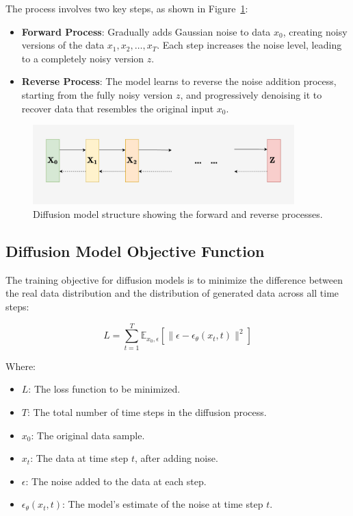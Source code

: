 The process involves two key steps, as shown in Figure~\ref{fig:Diffusion_structure}:
\begin{itemize}
  \item \textbf{Forward Process}: Gradually adds Gaussian noise to data \(x_0\), creating noisy versions of the data \(x_1, x_2, \dots, x_T\). Each step increases the noise level, leading to a completely noisy version \(z\).
  \item \textbf{Reverse Process}: The model learns to reverse the noise addition process, starting from the fully noisy version \(z\), and progressively denoising it to recover data that resembles the original input \(x_0\).
\end{itemize}

\begin{figure}[H]
    \centering
    \includegraphics[width=0.9\textwidth]{./Images/Diffusion_structure.jpg}
    \caption{Diffusion model structure showing the forward and reverse processes.}
    \label{fig:Diffusion_structure}
\end{figure}

\subsection{Diffusion Model Objective Function}

The training objective for diffusion models is to minimize the difference between the real data distribution and the distribution of generated data across all time steps:

\begin{equation}
L = \sum_{t=1}^{T} \mathbb{E}_{x_0, \epsilon} \left[ \|\epsilon - \epsilon_\theta(x_t, t)\|^2 \right]
\end{equation}

Where:
\begin{itemize}
    \item \(L\): The loss function to be minimized.
    \item \(T\): The total number of time steps in the diffusion process.
    \item \(x_0\): The original data sample.
    \item \(x_t\): The data at time step \(t\), after adding noise.
    \item \(\epsilon\): The noise added to the data at each step.
    \item \(\epsilon_\theta(x_t, t)\): The model's estimate of the noise at time step \(t\).
\end{itemize}

